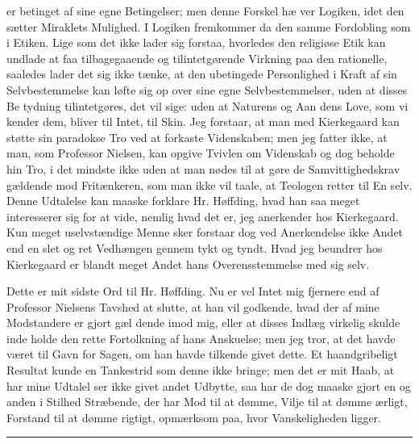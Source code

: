 \documentclass[12pt,a4paper,openany]{book}
\newcommand{\piecerule}{\par\begin{center}\rule{1.5cm}{0.4pt}\end{center}\par}
\newcommand{\opage}[1]{\marginnote{\footnotesize\textit{[#1]}}}
\begin{document}
er betinget af sine egne Betingelser; men denne Forskel hæ\-%
ver Logiken, idet den sætter Miraklets Mulighed. I Logiken
fremkommer da den samme Fordobling som i Etiken. Lige\-%
som det ikke lader sig forstaa, hvorledes den religiøse Etik
kan undlade at faa tilbagegaaende og tilintetgørende Virkning
paa den rationelle, saaledes lader det sig ikke tænke, at den
ubetingede Personlighed i Kraft af sin Selvbestemmelse kan løfte
sig op over sine egne Selvbestemmelser, uden at disses Be\-%
tydning tilintetgøres, det vil sige: uden at Naturens og Aan\-%
dens Love, som vi kender dem, bliver til Intet, til Skin. Jeg
forstaar, at man med Kierkegaard kan støtte sin paradokse
Tro ved at forkaste Videnskaben; men jeg fatter ikke, at man,
som Professor Nielsen, kan opgive Tvivlen om Videnskab og
dog beholde hin Tro, i det mindste ikke uden at man nødes
til at gøre de Samvittighedskrav gældende mod Fritænkeren,
som man ikke vil taale, at Teologen retter til En selv. Denne
Udtalelse kan maaske forklare Hr. Høffding, hvad han saa
meget interesserer sig for at vide, nemlig hvad det er, jeg
anerkender hos Kierkegaard. Kun meget uselvstændige Menne%
sker forstaar dog ved Anerkendelse ikke Andet end en slet og
ret Vedhængen gennem tykt og tyndt. Hvad jeg beundrer hos
Kierkegaard er blandt meget Andet hans Overensstemmelse med
sig selv.

Dette er mit sidste Ord til Hr. Høffding. Nu er vel Intet
mig fjernere end af Professor Nielsens Tavshed at slutte, at
han vil godkende, hvad der af mine Modstandere er gjort gæl\-%
dende imod mig, eller at disses Indlæg virkelig skulde inde\-%
holde den rette Fortolkning af hans Anskuelse; men jeg tror,
at det havde været til Gavn for Sagen, om han havde tilkende%
\opage{21}givet dette. Et haandgribeligt Resultat kunde en Tankestrid som
denne ikke bringe; men det er mit Haab, at har mine Udtalel\-%
ser ikke givet andet Udbytte, saa har de dog maaske gjort en
og anden i Stilhed Stræbende, der har Mod til at dømme, Vilje
til at dømme ærligt, Forstand til at dømme rigtigt, opmærksom
paa, hvor Vanskeligheden ligger.
\piecerule
\end{document}
